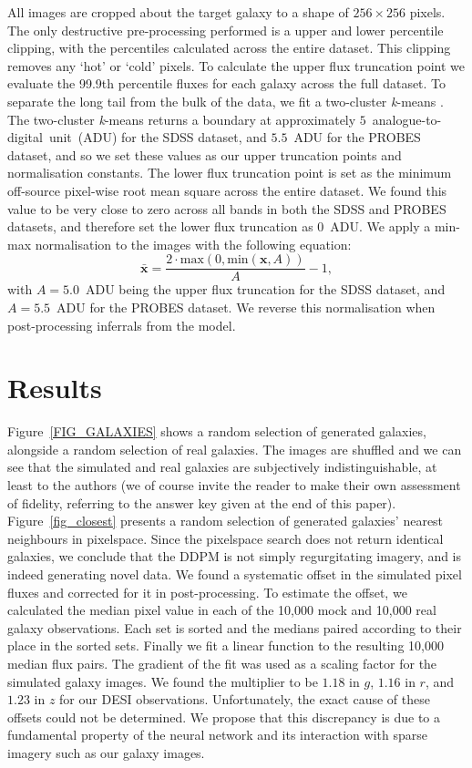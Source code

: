 \documentclass[fleqn,usenatbib]{mnras}
\begin{document}
All images are cropped about the target galaxy to a shape of \mbox{$256 \times
256$} pixels. The only destructive pre-processing performed is a upper
and lower percentile clipping, with the percentiles calculated across the
entire dataset. This clipping removes any `hot' or `cold' pixels. To calculate
the upper flux truncation point we evaluate the 99.9th percentile fluxes for
each galaxy across the full dataset. To separate the long tail from
the bulk of the data, we fit a two-cluster {\it k}-means \citep{cite_lloyd1982}.
The two-cluster {\it k}-means returns a boundary at approximately
$5$~analogue-to-digital~unit~(ADU) for the SDSS dataset, and $5.5$~ADU for the
PROBES dataset, and so we set these values as our upper truncation points and
normalisation constants. The lower flux truncation point is set as the minimum
off-source pixel-wise root mean square across the entire dataset. We found this
value to be very close to zero across all bands in both the SDSS and PROBES
datasets, and therefore set the lower flux truncation as $0$~ADU. We apply a
min-max normalisation to the images with the following equation:
\begin{equation}
    \bar{\mathbf{x}} = \frac{2 \cdot \text{max}(0, \text{min}(\mathbf{x}, A))}{A} - 1,
\end{equation}
with $A = 5.0$~ADU being the upper flux truncation for the SDSS dataset, and $A =
5.5$~ADU for the PROBES dataset. We reverse this normalisation when post-processing
inferrals from the model.

\section{Results} \label{sec_results}

Figure~\ref{FIG_GALAXIES} shows a random selection of generated galaxies,
alongside a random selection of real galaxies. The images are shuffled and we
can see that the simulated and real galaxies are subjectively
indistinguishable, at least to the authors (we of course invite the reader to
make their own assessment of fidelity, referring to the answer key given at the
end of this paper). Figure~\ref{fig_closest} presents a random selection of
generated galaxies' nearest neighbours in pixelspace. Since the pixelspace
search does not return identical galaxies, we conclude that the DDPM is not
simply regurgitating imagery, and is indeed generating novel data.  We found a
systematic offset in the simulated pixel fluxes and corrected for it in
post-processing.  To estimate the offset, we calculated the median pixel value
in each of the 10,000 mock and 10,000 real galaxy observations. Each set is
sorted and the medians paired according to their place in the sorted sets.
Finally we fit a linear function to the resulting 10,000 median flux pairs. The
gradient of the fit was used as a scaling factor for the simulated galaxy
images.  We found the multiplier to be $1.18$ in $g$, $1.16$ in $r$, and $1.23$
in $z$ for our DESI observations.  Unfortunately, the exact cause of these
offsets could not be determined.  We propose that this discrepancy is due to a
fundamental property of the neural network and its interaction with sparse
imagery such as our galaxy images.
\end{document}
